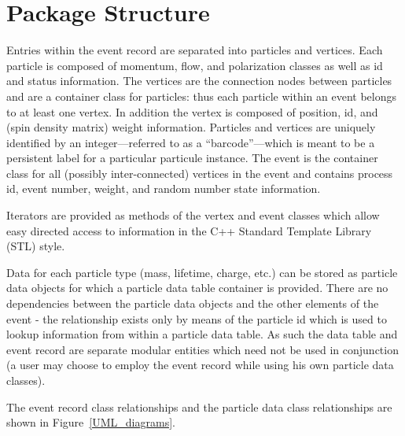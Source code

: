 \documentclass[11pt,letterpaper]{article}
\begin{document}
%
%

\section{Package Structure}

Entries within the event record are separated into particles and
vertices. Each particle is composed of momentum, flow, and
polarization classes as well as id and status information. 
The vertices are the connection nodes
between particles and are a container class for particles: thus each
particle within an event belongs to at least one vertex. In addition
the vertex is composed of position, id, and (spin density matrix) 
weight information. Particles and vertices are uniquely identified by
an integer---referred to as a ``barcode''---which is meant to be a
persistent label for a particular particule instance.
The event is the container class for all (possibly
inter-connected) vertices in the event and contains process id, event
number, weight, and random number state information.

Iterators are provided as methods of the vertex and event classes
which allow easy directed access to information in the C++ Standard
Template Library (STL) style.

Data for each particle type (mass, lifetime, charge, etc.) can be
stored as particle data objects for which a particle data table
container is provided. There are no dependencies between the particle
data objects and the other elements of the event - the relationship
exists only by means of the particle id which is used to lookup
information from within a particle data table. As such the data table
and event record are separate modular entities which need not be used
in conjunction (a user may choose to employ the event record while
using his own particle data classes).

The event record class relationships and the particle
data class relationships are shown in Figure~\ref{UML_diagrams}.
\end{document}
